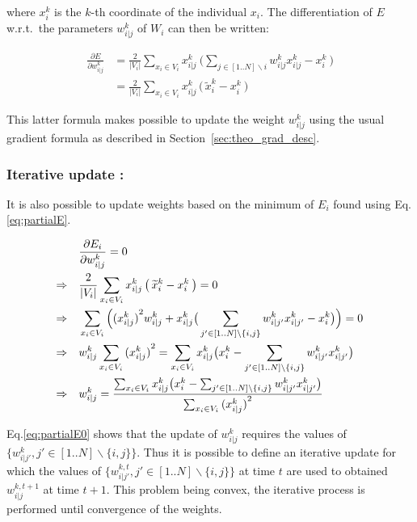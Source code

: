 where $x_i^k$ is the $k$-th coordinate of the individual $x_i$. The differentiation of $E$ w.r.t.\ the parameters $w_{i|j}^k$ of $W_i$ can then be written:
		
		\begin{align}
\label{eq:partialE}
            \frac{\partial E}{\partial w_{i|j}^k} &= \frac{2}{|V_i|}\sum_{x_i
            \in V_i} x_{i|j}^k \: \big(\sum_{j \in [1..N] \backslash i}
            w_{i|j}^k x_{i|j}^k - x_i^k\:\big) \nonumber \\
			&= \frac{2}{|V_i|}\sum_{x_i \in V_i} x_{i|j}^k \, \big(\,\widetilde{x}_i^k - x_i^k\:\big)
		\end{align}
		
        This latter formula makes possible to update the weight $w_{i|j}^k$ using the usual gradient formula as described in Section~\ref{sec:theo_grad_desc}.
		
		
		\subsubsection{Iterative update :}%
It is also possible to update weights based on the minimum of $E_i$ found using
Eq.\ref{eq:partialE}.
		
		\begin{align}
\label{eq:partialE0}
            &\frac{\partial E_i}{\partial w_{i|j}^k} = 0\notag\\
            \Rightarrow\quad &\frac{2}{|V_i|}\sum_{x_i \in V_i} x_{i|j}^k \,
            \big(\,\widetilde{x}_i^k - x_i^k\:\big) = 0\notag\\
            \Rightarrow\quad &\sum_{x_i \in V_i}
            \Big({(x_{i|j}^k)}^2w_{i|j}^k+x_{i|j}^k\big(\sum_{j'\in[1..N]\backslash
            \{i,j\}} w_{i|j'}^k x_{i|j'}^k - x_i^k \big)\Big) = 0\notag\\
            \Rightarrow \quad & w_{i|j}^k \sum_{x_i \in V_i}{(x_{i|j}^k)}^2
            = \sum_{x_i \in V_i} x_{i|j}^k\big(x_i^k -
            \sum_{j'\in[1..N]\backslash \{i,j\}} w_{i|j'}^k x_{i|j'}^k
            \big)\notag\\
            \Rightarrow \quad & w_{i|j}^k = \frac{\sum_{x_i \in V_i}
            x_{i|j}^k\big(x_i^k - \sum_{j'\in[1..N]\backslash \{i,j\}}
            w_{i|j'}^k x_{i|j'}^k \big)}{\sum_{x_i \in V_i}{(x_{i|j}^k)}^2}
		\end{align}
		
Eq.\ref{eq:partialE0} shows that the update of $w_{i|j}^k$ requires the values of $\{w_{i|j'}^k, j'\in[1..N]\backslash \{i,j\}\}$. Thus it is possible to define an iterative update for which the values of $\{w_{i|j'}^{k,t}, j'\in[1..N]\backslash \{i,j\}\}$ at time $t$ are used to obtained $w_{i|j}^{k,t+1}$ at time $t+1$. This problem being convex, the iterative process is performed until convergence of the weights.\\
		
